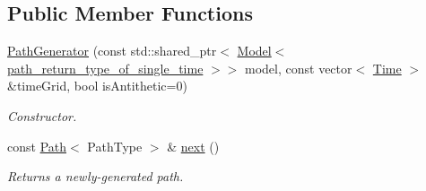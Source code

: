 \subsection*{Public Member Functions}
\begin{DoxyCompactItemize}
\item 
\hyperlink{class_path_generator_af6c5d75655e077378f702248f84e2920}{Path\+Generator} (const std\+::shared\+\_\+ptr$<$ \hyperlink{class_model}{Model}$<$ \hyperlink{class_path_generator_a467bc3ddaa5e9104170550617e767349}{path\+\_\+return\+\_\+type\+\_\+of\+\_\+single\+\_\+time} $>$$>$ model, const vector$<$ \hyperlink{_name_def_8h_ac2d3e0ba793497bcca555c7c2cf64ff3}{Time} $>$ \&time\+Grid, bool is\+Antithetic=0)
\begin{DoxyCompactList}\small\item\em Constructor. \end{DoxyCompactList}\item 
const \hyperlink{class_path}{Path}$<$ Path\+Type $>$ \& \hyperlink{class_path_generator_ae441d07eddccff9c1b53a8230d739a16}{next} ()
\begin{DoxyCompactList}\small\item\em Returns a newly-\/generated path. \end{DoxyCompactList}\end{DoxyCompactItemize}
